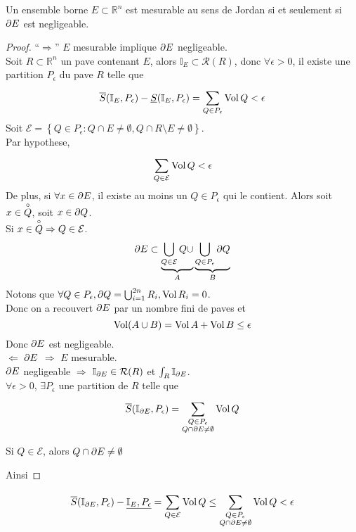 \documentclass[../main.tex]{subfiles}
\begin{document}
\begin{thm}
Un ensemble borne $E \subset \mathbb{R}^n$ est mesurable au sens de Jordan si et seulement si $\partial E$ est negligeable.
\end{thm}
\begin{proof}
``$\Rightarrow $''   $E$ mesurable implique $\partial E$ negligeable.\\
Soit $R \subset \mathbb{R}^n$ un pave contenant $E$, alors $ \mathbb{I}_E \subset \mathcal{R}( R) $, donc $\forall \epsilon >0$, il existe une partition $P_\epsilon$ du pave $R$ telle que
\[ 
	\overline S ( \mathbb{I}_E, P_\epsilon)  - \underline { S}  ( \mathbb{I}_E, P_\epsilon) = \sum_{Q\in P_\epsilon}^{ } \operatorname*{Vol} Q < \epsilon
\]
Soit $\mathcal{E} = \left\{ Q \in P_{\epsilon} : Q \cap E \neq \emptyset, Q\cap R \setminus E \neq \emptyset \right\} $.\\
Par hypothese,
\[ 
\sum_{Q \in \mathcal{E}}^{ } \operatorname*{Vol} Q < \epsilon
\]
De plus, si $ \forall x \in \partial E$, il existe au moins un $Q \in P_\epsilon$ qui le contient. Alors soit $x \in \overset{\circ}{Q}$, soit $x \in \partial Q $.\\
Si $x \in \overset{\circ}{Q} \Rightarrow  Q \in \mathcal{E}$. \\
\[ 
\partial E \subset \underbrace{\bigcup_{Q \in \mathcal{E}} Q \cup}_{A} \underbrace{\bigcup_{Q \in P_{\epsilon} } \partial Q}_{B}
\]
Notons que $\forall Q \in P_\epsilon, \partial Q = \bigcup_{i=1} ^{2n}R_i, \operatorname*{Vol} R_i = 0$.\\
Donc on a recouvert $\partial E$ par un nombre fini de paves et 
\[ 
	\operatorname*{Vol} ( A \cup B) = \operatorname*{Vol} A + \operatorname*{Vol} B \leq \epsilon
\]
Donc $\partial E$ est negligeable.\\
$\Leftarrow$  $\partial E$ $ \Rightarrow $ $E$ mesurable.\\
$\partial E$ negligeable $ \Rightarrow $ $ \mathbb{I}_{\partial E} \in \mathcal{R}( R) $ et $\int_{ R }^{  }\mathbb{I}_{\partial E} $.\\
$\forall \epsilon>0$, $\exists P_{\epsilon} $ une partition de $R$ telle que
\[ 
	\overline{S}( \mathbb{I}_{\partial E} , P_\epsilon) = \sum_{ \substack { Q \in P_\epsilon\\ Q \cap \partial E \neq \emptyset} }^{ } \operatorname*{Vol} Q 
\]
\begin{rmq}
Si $Q \in \mathcal{E}$, alors $Q \cap \partial E \neq \emptyset$
\end{rmq}
Ainsi





\end{proof}
\[ 
\overline{S}( \mathbb{I}_{\partial E} , P_\epsilon)  - \underline { \mathbb{I}_E, P_\epsilon } = \sum_{Q \in \mathcal{E}}^{ }\operatorname*{Vol} Q \leq  \sum_{ \substack { Q \in P_\epsilon \\ Q \cap \partial E \neq \emptyset } }^{ }\operatorname*{Vol} Q < \epsilon	
\]
\end{document}
